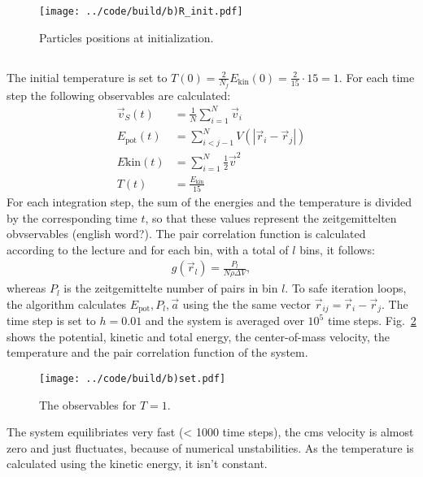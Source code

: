 \begin{figure}[h]
    \centering
    \texttt{[image: ../code/build/b)R\_init.pdf]}
    \caption{Particles positions at initialization.}
    \label{fig:b_1}
\end{figure}

\subsection{}
The initial temperature is set to $T(0) = \frac{2}{N_f} E_{\text{kin}}(0) = \frac{2}{15} \cdot 15 = 1$. For each time step the following observables are calculated:
\begin{align}
    \vec{v}_S(t) &= \frac{1}{N} \sum_{i=1}^N \vec{v}_i \\
    E_{\text{pot}}(t) &= \sum_{i<j-1}^N V\left( | \vec{r}_i - \vec{r}_j |  \right) \\
    E{\text{kin}}(t) &= \sum_{i=1}^N \frac{1}{2} \vec{v}^2 \\
    T(t) &= \frac{E_{\text{kin}}}{15}
\end{align}
For each integration step, the sum of the energies and the temperature is divided by the corresponding time $t$, so that these values represent the zeitgemittelten obvservables (english word?). The pair correlation function is calculated according to the lecture and for each bin, with a total of $l$ bins, it follows:
\begin{align}
    g(\vec{r}_l) = \frac{P_l}{N \rho \Delta V},
\end{align}
whereas $P_l$ is the zeitgemittelte number of pairs in bin $l$. To safe iteration loops, the algorithm calculates $E_{\text{pot}}, P_l, \vec{a}$ using the the same vector $\vec{r}_{ij} = \vec{r}_i - \vec{r}_j$. The time step is set to $h = 0.01$ and the system is averaged over $10^5$ time steps. Fig.~\ref{fig:b_2}  shows the potential, kinetic and total energy, the center-of-mass velocity, the temperature and the pair correlation function of the system.

\begin{figure}[h]
    \centering
    \texttt{[image: ../code/build/b)set.pdf]}
    \caption{The observables for $T=1$.}
    \label{fig:b_2}
\end{figure}

\noindent The system equilibriates very fast (< 1000 time steps), the cms velocity is almost zero and just fluctuates, because of numerical unstabilities. As the temperature is calculated using the kinetic energy, it isn't constant. 

